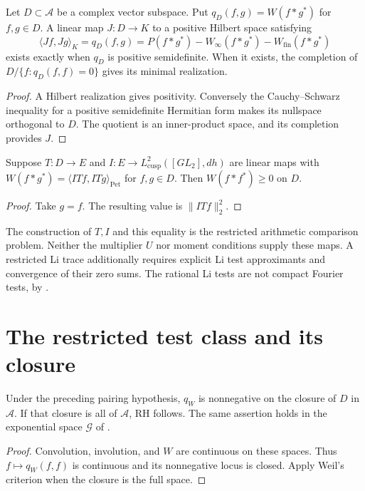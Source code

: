 \begin{theorem}
\label{v4-arith:w5-direct:thm:WP-isometry}
Let $D\subset\mathscr A$ be a complex vector subspace.
Put $q_D(f,g)=W(f*g^*)$ for $f,g\in D$.
A linear map $J:D\to K$ to a positive Hilbert space satisfying
\begin{equation}
\label{v4-arith:w5-direct:eq:WP-isometry}
 \langle Jf,Jg\rangle_K=q_D(f,g)
 =P(f*g^*)-W_\infty(f*g^*)-W_{\mathrm{fin}}(f*g^*)
\end{equation}
exists exactly when $q_D$ is positive semidefinite.
When it exists, the completion of $D/\{f:q_D(f,f)=0\}$ gives
its minimal realization.
\end{theorem}
\begin{proof}
A Hilbert realization gives positivity. Conversely the
Cauchy--Schwarz inequality for a positive semidefinite Hermitian
form makes its nullspace orthogonal to $D$. The quotient is an
inner-product space, and its completion provides $J$.
\end{proof}

\begin{corollary}
\label{v4-arith:w5-direct:thm:HPLi-elementary}
Suppose $T:D\to E$ and $I:E\to L^2_{\mathrm{cusp}}([GL_2],dh)$
are linear maps with
$W(f*g^*)=\langle ITf,ITg\rangle_{\mathrm{Pet}}$ for $f,g\in D$.
Then $W(f*f^*)\ge0$ on $D$.
\end{corollary}
\begin{proof}
Take $g=f$. The resulting value is $\|ITf\|_2^2$.
\end{proof}
The construction of $T,I$ and this equality is the restricted
arithmetic comparison problem. Neither the multiplier $U$ nor
moment conditions supply these maps. A restricted Li trace additionally
requires explicit Li test approximants and convergence of their zero
sums. The rational Li tests are not compact Fourier tests, by
.

\section{The restricted test class and its closure}
\label{v4-arith:w5-direct:closing-restricted}
\begin{theorem}
\label{v4-arith:w5-direct:thm:restricted-RH}
Under the preceding pairing hypothesis, $q_W$ is nonnegative on
the closure of $D$ in $\mathscr A$. If that closure is all of
$\mathscr A$, RH follows. The same assertion holds in the
exponential space $\mathscr G$ of
.
\end{theorem}
\begin{proof}
Convolution, involution, and $W$ are continuous on these spaces.
Thus $f\mapsto q_W(f,f)$ is continuous and its nonnegative locus
is closed. Apply Weil's criterion when the closure is the full space.
\end{proof}


